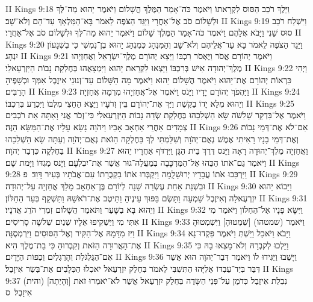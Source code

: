 II Kings 9:18	וַיֵּלֶךְ רֹכֵב הַסּוּס לִקְרָאתוֹ וַיֹּאמֶר כֹּה־אָמַר הַמֶּלֶךְ הֲשָׁלוֹם וַיֹּאמֶר יֵהוּא מַה־לְּךָ וּלְשָׁלוֹם סֹב אֶל־אַחֲרָי וַיַּגֵּד הַצֹּפֶה לֵאמֹר בָּא־הַמַּלְאָךְ עַד־הֵם וְלֹא־שָׁב׃
II Kings 9:19	וַיִּשְׁלַח רֹכֵב סוּס שֵׁנִי וַיָּבֹא אֲלֵהֶם וַיֹּאמֶר כֹּה־אָמַר הַמֶּלֶךְ שָׁלוֹם וַיֹּאמֶר יֵהוּא מַה־לְּךָ וּלְשָׁלוֹם סֹב אֶל־אַחֲרָי׃
II Kings 9:20	וַיַּגֵּד הַצֹּפֶה לֵאמֹר בָּא עַד־אֲלֵיהֶם וְלֹא־שָׁב וְהַמִּנְהָג כְּמִנְהַג יֵהוּא בֶן־נִמְשִׁי כִּי בְשִׁגָּעוֹן יִנְהָג׃
II Kings 9:21	וַיֹּאמֶר יְהוֹרָם אֱסֹר וַיֶּאְסֹר רִכְבּוֹ וַיֵּצֵא יְהוֹרָם מֶלֶךְ־יִשְׂרָאֵל וַאֲחַזְיָהוּ מֶלֶךְ־יְהוּדָה אִישׁ בְּרִכְבּוֹ וַיֵּצְאוּ לִקְרַאת יֵהוּא וַיִּמְצָאֻהוּ בְּחֶלְקַת נָבוֹת הַיִּזְרְעֵאלִי׃
II Kings 9:22	וַיְהִי כִּרְאוֹת יְהוֹרָם אֶת־יֵהוּא וַיֹּאמֶר הֲשָׁלוֹם יֵהוּא וַיֹּאמֶר מָה הַשָּׁלוֹם עַד־זְנוּנֵי אִיזֶבֶל אִמְּךָ וּכְשָׁפֶיהָ הָרַבִּים׃
II Kings 9:23	וַיַּהֲפֹךְ יְהוֹרָם יָדָיו וַיָּנֹס וַיֹּאמֶר אֶל־אֲחַזְיָהוּ מִרְמָה אֲחַזְיָה׃
II Kings 9:24	וְיֵהוּא מִלֵּא יָדוֹ בַקֶּשֶׁת וַיַּךְ אֶת־יְהוֹרָם בֵּין זְרֹעָיו וַיֵּצֵא הַחֵצִי מִלִּבּוֹ וַיִּכְרַע בְּרִכְבּוֹ׃
II Kings 9:25	וַיֹּאמֶר אֶל־בִּדְקַר שָׁלִשֹׁה שָׂא הַשְׁלִכֵהוּ בְּחֶלְקַת שְׂדֵה נָבוֹת הַיִּזְרְעֵאלִי כִּי־זְכֹר אֲנִי וָאַתָּה אֵת רֹכְבִים צְמָדִים אַחֲרֵי אַחְאָב אָבִיו וַיהֹוָה נָשָׂא עָלָיו אֶת־הַמַּשָּׂא הַזֶּה׃
II Kings 9:26	אִם־לֹא אֶת־דְּמֵי נָבוֹת וְאֶת־דְּמֵי בָנָיו רָאִיתִי אֶמֶשׁ נְאֻם־יְהֹוָה וְשִׁלַּמְתִּי לְךָ בַּחֶלְקָה הַזֹּאת נְאֻם־יְהֹוָה וְעַתָּה שָׂא הַשְׁלִכֵהוּ בַּחֶלְקָה כִּדְבַר יְהֹוָה׃
II Kings 9:27	וַאֲחַזְיָה מֶלֶךְ־יְהוּדָה רָאָה וַיָּנס דֶּרֶךְ בֵּית הַגָּן וַיִּרְדֹּף אַחֲרָיו יֵהוּא וַיֹּאמֶר גַּם־אֹתוֹ הַכֻּהוּ אֶל־הַמֶּרְכָּבָה בְּמַעֲלֵה־גוּר אֲשֶׁר אֶת־יִבְלְעָם וַיָּנס מְגִדּוֹ וַיָּמת שָׁם׃
II Kings 9:28	וַיַּרְכִּבוּ אֹתוֹ עֲבָדָיו יְרוּשָׁלָ͏ְמָה וַיִּקְבְּרוּ אֹתוֹ בִקְבֻרָתוֹ עִם־אֲבֹתָיו בְּעִיר דָּוִד׃ {פ}
II Kings 9:29	וּבִשְׁנַת אַחַת עֶשְׂרֵה שָׁנָה לְיוֹרָם בֶּן־אַחְאָב מָלַךְ אֲחַזְיָה עַל־יְהוּדָה׃
II Kings 9:30	וַיָּבוֹא יֵהוּא יִזְרְעֶאלָה וְאִיזֶבֶל שָׁמְעָה וַתָּשֶׂם בַּפּוּךְ עֵינֶיהָ וַתֵּיטֶב אֶת־רֹאשָׁהּ וַתַּשְׁקֵף בְּעַד הַחַלּוֹן׃
II Kings 9:31	וְיֵהוּא בָּא בַשָּׁעַר וַתֹּאמֶר הֲשָׁלוֹם זִמְרִי הֹרֵג אֲדֹנָיו׃
II Kings 9:32	וַיִּשָּׂא פָנָיו אֶל־הַחַלּוֹן וַיֹּאמֶר מִי אִתִּי מִי וַיַּשְׁקִיפוּ אֵלָיו שְׁנַיִם שְׁלֹשָׁה סָרִיסִים׃
II Kings 9:33	וַיֹּאמֶר (שמטהו) [שִׁמְטוּהָ] וַיִּשְׁמְטוּהָ וַיִּז מִדָּמָהּ אֶל־הַקִּיר וְאֶל־הַסּוּסִים וַיִּרְמְסֶנָּה׃
II Kings 9:34	וַיָּבֹא וַיֹּאכַל וַיֵּשְׁתְּ וַיֹּאמֶר פִּקְדוּ־נָא אֶת־הָאֲרוּרָה הַזֹּאת וְקִבְרוּהָ כִּי בַת־מֶלֶךְ הִיא׃
II Kings 9:35	וַיֵּלְכוּ לְקבְרָהּ וְלֹא־מָצְאוּ בָהּ כִּי אִם־הַגֻּלְגֹּלֶת וְהָרַגְלַיִם וְכַפּוֹת הַיָּדָיִם׃
II Kings 9:36	וַיָּשֻׁבוּ וַיַּגִּידוּ לוֹ וַיֹּאמֶר דְּבַר־יְהֹוָה הוּא אֲשֶׁר דִּבֶּר בְּיַד־עַבְדּוֹ אֵלִיָּהוּ הַתִּשְׁבִּי לֵאמֹר בְּחֵלֶק יִזְרְעֶאל יֹאכְלוּ הַכְּלָבִים אֶת־בְּשַׂר אִיזָבֶל׃
II Kings 9:37	(והית) [וְהָיְתָה] נִבְלַת אִיזֶבֶל כְּדֹמֶן עַל־פְּנֵי הַשָּׂדֶה בְּחֵלֶק יִזְרְעֶאל אֲשֶׁר לֹא־יֹאמְרוּ זֹאת אִיזָבֶל׃ {ס}        

